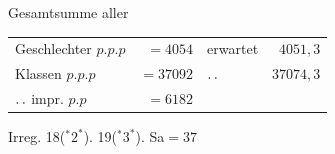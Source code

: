 \par\medskip\noindent Gesamtsumme aller
\begin{center}\begin{tabular}{@{}lrlr@{}}
Geschlechter $p.p.p$ & $=4054$ & erwartet & $4051{,}3$\\
Klassen $p.p.p$ & $=37092$ & $\mathinner{.\,.}$ & $37074{,}3$\\
$\mathinner{.\,.}$ impr. $p.p$ & $=6182$ & &\\
\end{tabular}\end{center}
\noindent Irreg. 18(${}^{*}2^{*}$). 19(${}^{*}3^{*}$). Sa$=37$

